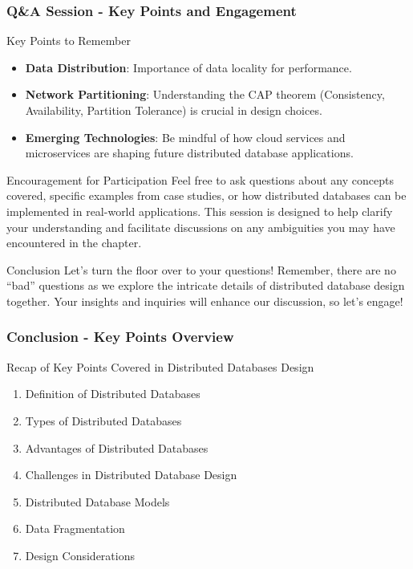 \documentclass[aspectratio=169]{beamer}
\begin{document}
\begin{frame}[fragile]
  \frametitle{Q\&A Session - Key Points and Engagement}
  \begin{block}{Key Points to Remember}
    \begin{itemize}
      \item \textbf{Data Distribution}: Importance of data locality for performance.
      \item \textbf{Network Partitioning}: Understanding the CAP theorem (Consistency, Availability, Partition Tolerance) is crucial in design choices.
      \item \textbf{Emerging Technologies}: Be mindful of how cloud services and microservices are shaping future distributed database applications.
    \end{itemize}
  \end{block}

  \begin{block}{Encouragement for Participation}
    Feel free to ask questions about any concepts covered, specific examples from case studies, or how distributed databases can be implemented in real-world applications. This session is designed to help clarify your understanding and facilitate discussions on any ambiguities you may have encountered in the chapter.
  \end{block}

  \begin{block}{Conclusion}
    Let’s turn the floor over to your questions! Remember, there are no “bad” questions as we explore the intricate details of distributed database design together. Your insights and inquiries will enhance our discussion, so let’s engage!
  \end{block}
\end{frame}

\begin{frame}[fragile]
  \frametitle{Conclusion - Key Points Overview}
  
  \begin{block}{Recap of Key Points Covered in Distributed Databases Design}
    \begin{enumerate}
      \item Definition of Distributed Databases
      \item Types of Distributed Databases
      \item Advantages of Distributed Databases
      \item Challenges in Distributed Database Design
      \item Distributed Database Models
      \item Data Fragmentation
      \item Design Considerations
    \end{enumerate}
  \end{block}
\end{frame}
\end{document}
